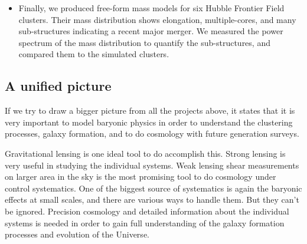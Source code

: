\begin{itemize}
\item Finally, we produced free-form  mass models for six Hubble Frontier Field clusters.
	Their mass distribution shows elongation, multiple-cores, and many sub-structures
	indicating a recent major merger. We measured the power spectrum of the mass 
	distribution to quantify the sub-structures, and compared them to the simulated
	clusters.

\end{itemize}





\subsection{A unified picture}

If we try to draw a bigger picture from all the projects above, 
it states that it is very important to model baryonic physics 
in order to understand the clustering processes,
galaxy formation, and to do cosmology with future generation surveys. 

Gravitational lensing is one ideal tool to do accomplish this. Strong lensing
is very useful in studying the individual systems. 
Weak lensing shear measurements
on larger area in the sky is the most promising tool to do cosmology under
control systematics. One of the biggest source of systematics is again the 
baryonic effects at small scales, and there are various ways to handle them. But
they can't be ignored. Precision cosmology and detailed information about the 
individual systems is needed in order to gain full understanding of the 
galaxy formation processes and evolution of the Universe. 








